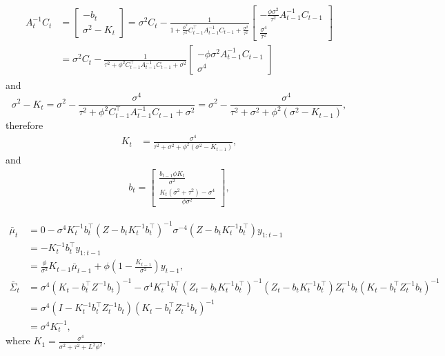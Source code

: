\begin{align}
\begin{split}
A_{t}^{-1}C_{t} &= \left[ \begin{array}{c} -b_{t} \\ \sigma^2-K_{t}\end{array} \right] = \sigma^2C_{t}-\frac{1}{1+\frac{\phi^2}{\tau^2} C_{t-1}^\top A_{t-1}^{-1}C_{t-1}+\frac{\sigma^2}{\tau^2}} \left[\begin{array}{c} -\frac{\phi\sigma^2}{\tau^2} A_{t-1}^{-1}C_{t-1} \\\frac{\sigma^4}{\tau^2} \end{array}\right] \\
&= \sigma^2C_{t}-\frac{1}{\tau^2+\phi^2C_{t-1}^\top A_{t-1}^{-1}C_{t-1}+\sigma^2} \left[\begin{array}{c} -\phi\sigma^2 A_{t-1}^{-1}C_{t-1} \\ \sigma^4 \end{array}\right]
\end{split}
\end{align}
and
\begin{equation*}
\sigma^2-K_{t} = \sigma^2 - \frac{\sigma^4}{\tau^2+\phi^2C_{t-1}^\top A_{t-1}^{-1}C_{t-1}+\sigma^2} = \sigma^2 - \frac{\sigma^4}{\tau^2+\sigma^2+\phi^2(\sigma^2-K_{t-1})},
\end{equation*}
therefore
\begin{align}
K_{t}  &=\frac{\sigma^4}{\tau^2+\sigma^2+\phi^2(\sigma^2-K_{t-1})},
\end{align}
and
\begin{align*}b_{t} = 
\begin{bmatrix}
\frac{b_{t-1}\phi K_{t}}{\sigma^2} \\ \frac{K_{t}(\sigma^2+\tau^2)-\sigma^4 }{\phi\sigma^2}
\end{bmatrix},
\end{align*}

\begin{align*}
\bar{\mu}_{t}      &= 0-\sigma^4 K_t^{-1}b_t^\top (Z-b_tK_t^{-1}b_t^\top)^{-1} \sigma^{-4} (Z-b_tK_t^{-1}b_t^\top) y_{1:t-1} \\
					 & =-K_t^{-1}b_t^\top y_{1:t-1} \\
					 & = \frac{\phi}{\sigma^2}K_{t-1}\bar{\mu}_{t-1} + \phi (1 - \frac{K_{t-1}}{\sigma^2})y_{t-1}, \\
\bar{\Sigma}_{t} &= \sigma^4(K_t-b_t^\top Z^{-1}b_t)^{-1}- \sigma^4K_t^{-1}b_t^\top (Z_t-b_tK_t^{-1}b_t^\top)^{-1} (Z_t-b_tK_t^{-1}b_t^\top)Z_t^{-1}b_t(K_t-b_t^\top Z_t^{-1}b_t)^{-1}\\
                     & = \sigma^4(I-K_t^{-1}b_t^\top Z_t^{-1}b_t)(K_t-b_t^\top Z_t^{-1}b_t)^{-1} \\
                     & = \sigma^4K_{t}^{-1},
\end{align*}
where $K_1=\frac{\sigma^4}{\sigma^2+\tau^2+L^2\phi^2}$.





